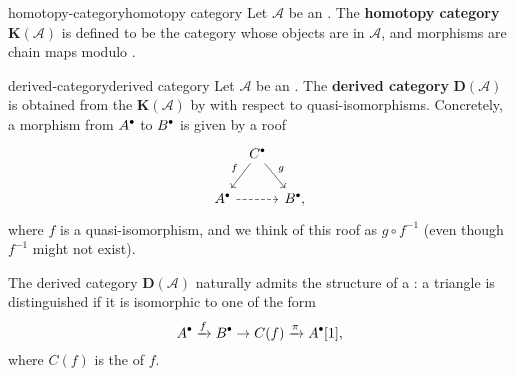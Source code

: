 \begin{topic}{homotopy-category}{homotopy category}
    Let $\mathcal{A}$ be an . The \textbf{homotopy category} $\textbf{K}(\mathcal{A})$ is defined to be the category whose objects are  in $\mathcal{A}$, and morphisms are chain maps modulo .
\end{topic}

\begin{topic}{derived-category}{derived category}
    Let $\mathcal{A}$ be an . The \textbf{derived category} $\textbf{D}(\mathcal{A})$ is obtained from the  $\textbf{K}(\mathcal{A})$ by  with respect to quasi-isomorphisms. Concretely, a morphism from $A^\bdot$ to $B^\bdot$ is given by a roof
    \[ \svg \begin{tikzcd}[column sep = 0.5em] & \arrow[swap]{ld}{f} C^\bdot \arrow{rd}{g} & \\ A^\bdot \arrow[dashed]{rr} & & B^\bdot , \end{tikzcd} \]
    where $f$ is a quasi-isomorphism, and we think of this roof as $g \circ f^{-1}$ (even though $f^{-1}$ might not exist).
    
    The derived category $\textbf{D}(\mathcal{A})$ naturally admits the structure of a : a triangle is distinguished if it is isomorphic to one of the form
    \[ A^\bdot \xrightarrow{f} B^\bdot \to C(f) \xrightarrow{\pi} A^\bdot[1] , \]
    where $C(f)$ is the  of $f$.
\end{topic}

